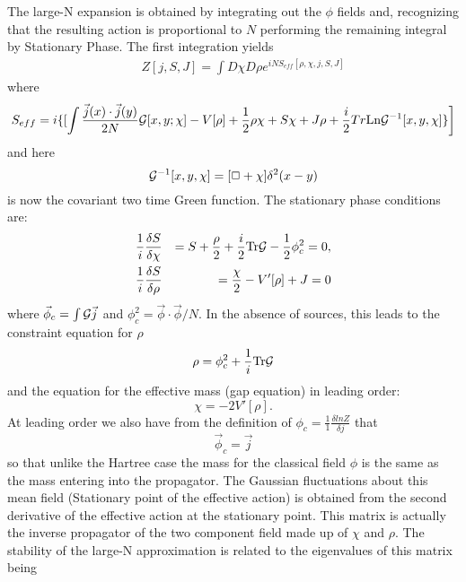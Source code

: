 \documentclass[a4paper,prd,preprint,superscriptaddress,showpacs,byrevtex]{revtex4}
\begin{document}
The large-N expansion is obtained by integrating out the $\phi$ fields and,
recognizing that the
resulting action is proportional to $N$
performing the remaining  integral by Stationary Phase.  The first
integration yields
\begin{eqnarray}
&& Z[j,S,J] = \int  D\chi  D  \rho e^{ i N S_{eff}[\rho,\chi, j,S,J]}
\end{eqnarray}
where
\begin{equation}
S_{eff} =  i \{ [  \int  \frac {\vec j(x) \cdot \vec j (y)}{2 N}
{\cal G}[x,y; \chi]
- V[\rho] + \frac{1}{2} \rho \chi+  S \chi + J {\rho} + \frac{i}{2} Tr {\rm
Ln}
{\cal G}^{-1} [x,y, \chi] \} \biggr]
\end{equation}
and here
\begin{equation}
{\cal G}^{-1} [x,y, \chi]= [\Box + \chi] \delta^2(x-y)
\end{equation}
is now the covariant two time Green function.
The stationary phase conditions are:
\begin{eqnarray}
\frac{1}{i}\frac{\delta S}{\delta \chi}&&= S+\frac{\rho}{2} + \frac{i}{2}
{\rm
Tr} {\cal G} - \frac {1}{2}\phi_c^2 =0, \nonumber \\
\frac{1}{i}\frac{\delta S}{\delta \rho}&&= \frac {\chi}{2} - V'[\rho] + J =0
\end{eqnarray}
where $ {\vec \phi}_c  =  \int {\cal G} {\vec j}$ and $\phi_c^2= {\vec \phi}
\cdot {\vec \phi}/N$.
In the absence of sources, this leads to the constraint equation for $\rho$
\begin{equation}
\rho = \phi_c^2 + \frac{1}{i} {\rm Tr }{\cal G}
\end{equation}
and the equation for the effective mass (gap equation) in leading order:
\begin{equation}
\chi = - 2 V'[\rho].
\end{equation}
At leading order we also have from the definition of $\phi_c= \frac{1}{1}
\frac {\delta ln Z}{\delta j}$ that
\begin{equation}
[\Box + \chi] \vec \phi_c = \vec j
\end{equation}
so that unlike the Hartree case the mass for the classical field $\phi$ is
the same as the mass entering into the propagator.
The Gaussian fluctuations about this mean field (Stationary point of the
effective action)  is obtained from the second derivative of the effective
action at the stationary point. This matrix is actually the inverse
propagator
of the two component field made up of $\chi$ and $\rho$.  The stability of
the
large-N approximation is related to the eigenvalues of this matrix being
\end{document}

